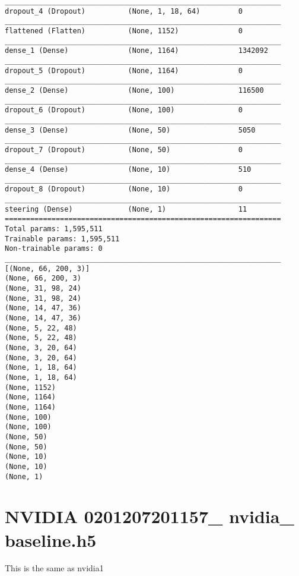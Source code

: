 \begin{verbatim}
_________________________________________________________________
dropout_4 (Dropout)          (None, 1, 18, 64)         0         
_________________________________________________________________
flattened (Flatten)          (None, 1152)              0         
_________________________________________________________________
dense_1 (Dense)              (None, 1164)              1342092   
_________________________________________________________________
dropout_5 (Dropout)          (None, 1164)              0         
_________________________________________________________________
dense_2 (Dense)              (None, 100)               116500    
_________________________________________________________________
dropout_6 (Dropout)          (None, 100)               0         
_________________________________________________________________
dense_3 (Dense)              (None, 50)                5050      
_________________________________________________________________
dropout_7 (Dropout)          (None, 50)                0         
_________________________________________________________________
dense_4 (Dense)              (None, 10)                510       
_________________________________________________________________
dropout_8 (Dropout)          (None, 10)                0         
_________________________________________________________________
steering (Dense)             (None, 1)                 11        
=================================================================
Total params: 1,595,511
Trainable params: 1,595,511
Non-trainable params: 0
_________________________________________________________________
[(None, 66, 200, 3)]
(None, 66, 200, 3)
(None, 31, 98, 24)
(None, 31, 98, 24)
(None, 14, 47, 36)
(None, 14, 47, 36)
(None, 5, 22, 48)
(None, 5, 22, 48)
(None, 3, 20, 64)
(None, 3, 20, 64)
(None, 1, 18, 64)
(None, 1, 18, 64)
(None, 1152)
(None, 1164)
(None, 1164)
(None, 100)
(None, 100)
(None, 50)
(None, 50)
(None, 10)
(None, 10)
(None, 1)
\end{verbatim}

\section{NVIDIA 0201207201157\_ nvidia\_ baseline.h5}
\label{0201207201157_nvidia_baseline}
This is the same as nvidia1


